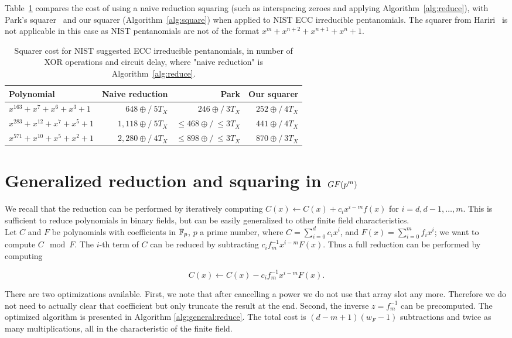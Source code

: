Table~\ref{table:comparison_nist} compares the cost of using a naive reduction squaring (such as interspacing zeroes and applying Algorithm~\ref{alg:reduce}), with Park's squarer~\cite{park2012explicit} and our squarer (Algorithm~\ref{alg:square}) when applied to NIST ECC irreducible pentanomials. The squarer from Hariri~\cite{hariri2009bit} is not applicable in this case as NIST pentanomials are not of the format $x^m+x^{n+2}+x^{n+1}+x^{n}+1$.

\begin{table}
\centering
\caption{Squarer cost for NIST suggested ECC irreducible pentanomials, in number of XOR operations and circuit delay, where "naive reduction" is Algorithm~\ref{alg:reduce}.}
{\begin{tabular}{l r r r} \label{table:comparison_nist}
Polynomial & Naive reduction & Park \cite{park2012explicit} & Our squarer \\ \hline
$x^{163} + x^7 + x^6 + x^3 + 1$ & $648\oplus/~5T_X$ & $246\oplus/~3T_X$ & $252\oplus/~4T_X$ \\ \hline
$x^{283} + x^{12} + x^7 + x^5 + 1$ & $1,118\oplus/~5T_X$ & $\leq468\oplus/~\leq3T_X$ & $441\oplus/~4T_X$ \\ \hline
$x^{571} + x^{10} + x^5 + x^2 + 1$ & $2,280\oplus/~4T_X$ & $\leq898\oplus/~\leq3T_X$ & $870\oplus/~3T_X$
\end{tabular}}{}
\end{table}

\section{Generalized reduction and squaring in $GF(\MakeLowercase{p}^\MakeLowercase{m})$}

We recall that the reduction can be performed by iteratively computing $C(x) \leftarrow C(x) + c_{i} x^{i-m} f(x)$ for $i = d, d-1, \ldots, m$. This is sufficient to reduce polynomials in binary fields, but can be easily generalized to other finite field characteristics. \\

Let $C$ and $F$ be polynomials with coefficients in $\mathbb{F}_p$, $p$ a prime number, where $C = \sum_{i=0}^d c_i x^i$, and $F(x) = \sum_{i=0}^m f_i x^i$; we want to compute $C \mod F$. The $i$-th term of $C$ can be reduced by subtracting $c_i f_m^{-1} x^{i-m} F(x)$. Thus a full reduction can be performed by computing

$$C(x) \leftarrow C(x) - c_i f_m^{-1} x^{i-m} F(x).$$

There are two optimizations available. First, we note that after cancelling a power we do not use that array slot any more. Therefore we do not need to actually clear that coefficient but only truncate the result at the end. Second, the inverse $z = f_m^{-1}$ can be precomputed. The optimized algorithm is presented in Algorithm \ref{alg:general:reduce}. The total cost is $(d-m+1) (w_F-1)$ subtractions and twice as many multiplications, all in the characteristic of the finite field.


